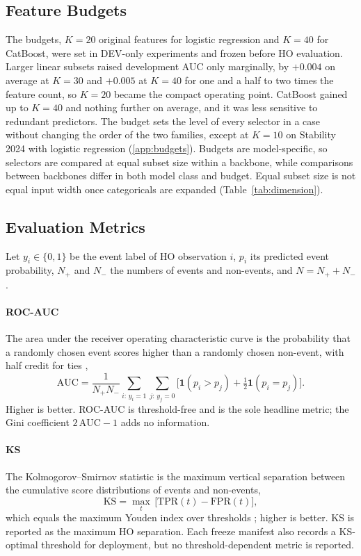 \documentclass[final,5p,twocolumn]{elsarticle}
\newcommand{\Kfeat}{K}
\newcommand{\AUC}{\mathrm{AUC}}
\newcommand{\KS}{\mathrm{KS}}
\newcommand{\TPR}{\mathrm{TPR}}
\newcommand{\FPR}{\mathrm{FPR}}
\begin{document}
\subsection{Feature Budgets}
\label{subsec:feature_budgets}

The budgets, $\Kfeat=20$ original features for logistic regression and $\Kfeat=40$ for CatBoost, were set in DEV-only experiments and frozen before HO evaluation. Larger linear subsets raised development AUC only marginally, by $+0.004$ on average at $\Kfeat=30$ and $+0.005$ at $\Kfeat=40$ for one and a half to two times the feature count, so $\Kfeat=20$ became the compact operating point. CatBoost gained up to $\Kfeat=40$ and nothing further on average, and it was less sensitive to redundant predictors. The budget sets the level of every selector in a case without changing the order of the two families, except at $\Kfeat=10$ on Stability 2024 with logistic regression (\ref{app:budgets}). Budgets are model-specific, so selectors are compared at equal subset size within a backbone, while comparisons between backbones differ in both model class and budget. Equal subset size is not equal input width once categoricals are expanded (Table~\ref{tab:dimension}).

\subsection{Evaluation Metrics}
\label{subsec:metrics}

Let $y_i\in\{0,1\}$ be the event label of HO observation $i$, $p_i$ its predicted event probability, $N_+$ and $N_-$ the numbers of events and non-events, and $N=N_++N_-$.

\paragraph{ROC-AUC}
The area under the receiver operating characteristic curve is the probability that a randomly chosen event scores higher than a randomly chosen non-event, with half credit for ties \cite{hanley1982},
\begin{equation}
    \AUC=\frac{1}{N_+N_-}\sum_{i:\,y_i=1}\sum_{j:\,y_j=0}\big[\mathbf{1}(p_i>p_j)+\tfrac12\mathbf{1}(p_i=p_j)\big].
    \label{eq:roc_auc}
\end{equation}
Higher is better. ROC-AUC is threshold-free and is the sole headline metric; the Gini coefficient $2\,\AUC-1$ adds no information.

\paragraph{KS}
The Kolmogorov--Smirnov statistic is the maximum vertical separation between the cumulative score distributions of events and non-events,
\begin{equation}
    \KS=\max_{t}\,\big[\TPR(t)-\FPR(t)\big],
    \label{eq:ks}
\end{equation}
which equals the maximum Youden index over thresholds \cite{youden1950}; higher is better. KS is reported as the maximum HO separation. Each freeze manifest also records a KS-optimal threshold for deployment, but no threshold-dependent metric is reported.
\end{document}
